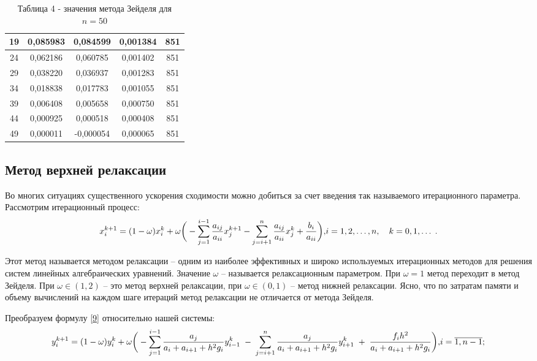 \documentclass[a4paper,12pt]{article}
\begin{document}
{\begin{table}[h]
\begin{tabular}{|c|c|c|c|c|}
       19 &  0,085983 &  0,084599 &  0,001384 & 851 \\ \hline
       24 &  0,062186 &  0,060785 &  0,001402 & 851 \\ \hline
       29 &  0,038220 &  0,036937 &  0,001283 & 851 \\ \hline
       34 &  0,018838 &  0,017783 &  0,001055 & 851 \\ \hline
       39 &  0,006408 &  0,005658 &  0,000750 & 851 \\ \hline
       44 &  0,000925 &  0,000518 &  0,000408 & 851 \\ \hline
       49 &  0,000011 & -0,000054 &  0,000065 & 851 \\ \hline
    \end{tabular}
    \caption*{\small{Таблица 4 - значения метода Зейделя для $n = 50$}}
\end{table}
\clearpage
\subsection{Метод верхней релаксации}
\hspace{1.25cm}Во многих ситуациях существенного ускорения сходимости можно добиться за счет введения так называемого итерационного параметра. 
Рассмотрим итерационный процесс:
\begin{equation}
    x_i^{k+1}=(1-\omega)x_i^k+\omega \bigg( - \sum\limits_{j=1}^{i-1} \frac{a_{ij}}{a_{ii}}x_j^{k+1}- \sum\limits_{j=i+1}^{n} \frac{a_{ij}}{a_{ii}}x_j^{k}+\frac{b_i}{a_{ii}}\bigg),
    $$$$ i=1,2, \dots, n, \quad k=0,1, \dots \; .
    \label{9}
\end{equation}

Этот метод называется методом релаксации -- одним из наиболее эффективных и широко используемых итерационных 
методов для решения систем линейных алгебраичес\-ких уравнений. Значение $\omega $ -- называется релаксационным параметром. 
При $\omega = 1$ метод переходит в метод Зейделя. При $\omega \in (1,2)$ -- это метод верхней релаксации, при $\omega \in (0,1)$ -- метод нижней релаксации. 
Ясно, что по затратам памяти и объему вычислений на каждом шаге итераций метод релаксации не отличается от метода Зейделя.

Преобразуем формулу \eqref{9} относительно нашей системы:
\begin{equation}
    y_i^{k+1}=(1-\omega)y_i^k+\omega  \bigg(-\sum\limits_{j=1}^{i-1}\frac{a_j}{a_i+a_{i+1}+h^2 g_i}y_{i-1}^k \; - \;\sum\limits_{j=i+1}^{n}\frac{a_{j}}{a_i+a_{i+1}+h^2 g_i}y_{i+1}^k\; +\; \frac{f_i h^2}{a_i+a_{i+1}+h^2 g_i}\bigg),$$$$
    i=\overline{1, n-1};
    \label{10}
\end{equation}

}
\end{document}
